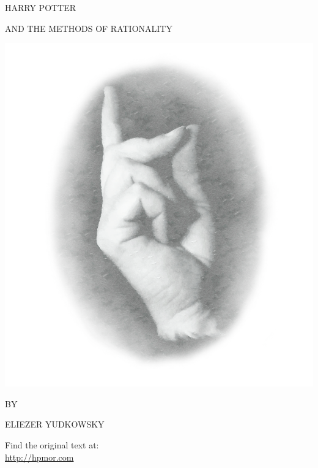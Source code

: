 \clearpage

\begin{center}
\thispagestyle{empty}
{\hp
\Huge\MakeUppercase{Harry Potter}\vspace*{0.5cm}

\Large\MakeUppercase{and the Methods of Rationality} %
 
\includegraphics[scale=0.5]{bubble0.png} 

\Large BY \vspace*{.25cm}

\huge ELIEZER YUDKOWSKY%

\normalsize
}

\vspace{3cm}
Find the original text at:\\
\url{http://hpmor.com} \\

\end{center}

